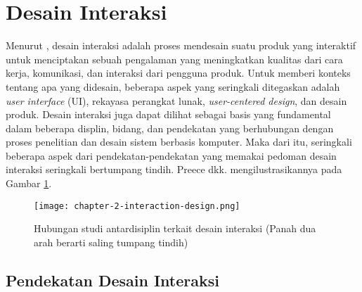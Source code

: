 

\section{Desain Interaksi}


Menurut \textcite{PreeceRogersSharp15}, desain interaksi adalah proses mendesain suatu produk yang interaktif untuk menciptakan sebuah pengalaman yang meningkatkan kualitas dari cara kerja, komunikasi, dan interaksi dari pengguna produk. Untuk memberi konteks tentang apa yang didesain, beberapa aspek yang seringkali ditegaskan adalah \textit{user interface} (UI), rekayasa perangkat lunak, \textit{user-centered design}, dan desain produk. Desain interaksi juga dapat dilihat sebagai basis yang fundamental dalam beberapa displin, bidang, dan pendekatan yang berhubungan dengan proses penelitian dan desain sistem berbasis komputer. Maka dari itu, seringkali beberapa aspek dari pendekatan-pendekatan yang memakai pedoman desain interaksi seringkali bertumpang tindih. Preece dkk. mengilustrasikannya pada Gambar \ref{fig:desain_interaksi}.


\begin{figure}[h]
  \centering
  \texttt{[image: chapter-2-interaction-design.png]}
  \caption{Hubungan studi antardisiplin terkait desain interaksi (Panah dua arah berarti saling tumpang tindih) \textcite{PreeceRogersSharp15}}
  \label{fig:desain_interaksi}
\end{figure}

\FloatBarrier

\subsection{Pendekatan Desain Interaksi}
\label{subsec:pendekatan_id}

